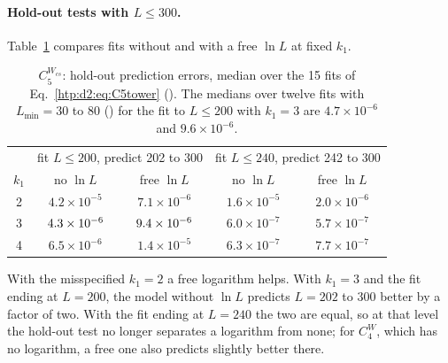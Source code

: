 \paragraph{Hold-out tests with $L\le300$.} Table~\ref{htp:d2:tab:c5log} compares fits without and with a free $\ln L$ at fixed
$k_1$.

\begin{table}[ht]
\centering\footnotesize\renewcommand{\arraystretch}{1.15}
\begin{tabular}{@{}ccccc@{}}
\toprule
 & \multicolumn{2}{c}{fit $L\le200$, predict 202 to 300} & \multicolumn{2}{c}{fit $L\le240$, predict 242 to 300} \\
$k_1$ & no $\ln L$ & free $\ln L$ & no $\ln L$ & free $\ln L$ \\\midrule
2 & $4.2\times10^{-5}$ & $7.1\times10^{-6}$ & $1.6\times10^{-5}$ & $2.0\times10^{-6}$ \\
3 & $4.3\times10^{-6}$ & $9.4\times10^{-6}$ & $6.0\times10^{-7}$ & $5.7\times10^{-7}$ \\
4 & $6.5\times10^{-6}$ & $1.4\times10^{-5}$ & $6.3\times10^{-7}$ & $7.7\times10^{-7}$ \\
\bottomrule
\end{tabular}
\caption{$C_5^{W_{cs}}$: hold-out prediction errors, median over the 15 fits of Eq.~\eqref{htp:d2:eq:C5tower}
(). The medians over twelve fits with $L_{\min}=30$ to 80
() for the fit to $L\le200$ with $k_1=3$ are $4.7\times10^{-6}$ and $9.6\times10^{-6}$.}
\label{htp:d2:tab:c5log}
\end{table}

With the misspecified $k_1=2$ a free logarithm helps. With $k_1=3$ and the fit ending at $L=200$, the model without $\ln L$
predicts $L=202$ to 300 better by a factor of two. With the fit ending at $L=240$ the two are equal, so at that level the
hold-out test no longer separates a logarithm from none; for $C_4^W$, which has no logarithm, a free one also predicts slightly
better there.

